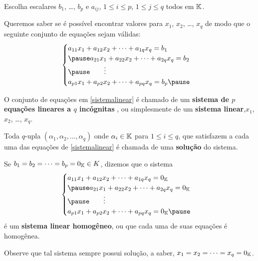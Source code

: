 \documentclass{beamer}
\begin{document}
        \begin{frame}
 
        \vspace{.3cm}

        Escolha escalares $b_1$, \dots, $b_p$ \pause e $a_{ij}$, \pause $1 \le i \le p$, $1 \le j \le q$ todos em $\mathbb{K}$.

        Queremos saber se é possível encontrar valores para  $x_1$, $x_2$, \dots, $x_q$ \pause de modo que o seguinte conjunto de equações sejam válidas: \pause
        \begin{equation}\label{sistemalinear}\index{Sistema Linear}
	    \begin{cases}
                a_{11}x_1 + a_{12}x_2 + \cdots + a_{1q}x_q = b_1\\\pause
                a_{21}x_1 + a_{22}x_2 + \cdots + a_{2q}x_q = b_2\\\pause
                \qquad \vdots\\
                a_{p1}x_1 + a_{p2}x_2 + \cdots + a_{pq}x_q = b_p\pause
            \end{cases}
        \end{equation}
        
        O conjunto de equações em \eqref{sistemalinear} é chamado de um \pause \textbf{sistema de $p$ equa\c{c}\~oes lineares \pause a $q$ inc\'ognitas} \pause , ou simplesmente de um \textbf{sistema linear},\pause$x_1$, $x_2$, \dots, $x_q$.\pause

        \vspace{.3cm}

        Toda $q$-upla $(\alpha_1, \alpha_2, \dots, \alpha_q)$ \pause onde $\alpha_i \in \mathbb{K}$ para $1 \le i \le q$, \pause que satisfazem a cada uma das equa\c{c}\~oes de \eqref{sistemalinear} \pause \'e chamada de uma \textbf{solu\c{c}\~ao} do sistema.
    \end{frame}

    \begin{frame}
        Se $b_1 = b_2 = \cdots = b_p = 0_{\mathbb{K}} \in K$, \pause dizemos que o sistema\pause
        \begin{equation}\label{sistemalinearhomogeneo}\index{Sistema Linear}
            \begin{cases}
                a_{11}x_1 + a_{12}x_2 + \cdots + a_{1q}x_q = 0_\cp{K}\\\pause
                a_{21}x_1 + a_{22}x_2 + \cdots + a_{2q}x_q = 0_\cp{K}\\\pause
                \qquad \vdots\\
                a_{p1}x_1 + a_{p2}x_2 + \cdots + a_{pq}x_q = 0_\cp{K}\pause
            \end{cases}
        \end{equation}
        \'e um \textbf{sistema linear homog\^eneo}, \pause ou que cada uma de suas equa\c{c}\~oes \'e homog\^enea. \pause

        \vspace{.3cm}

        Observe que tal sistema sempre possui solu\c{c}\~ao, \pause a saber, $x_1 = x_2 = \cdots = x_q = 0_{\mathbb{K}}$.
    \end{frame}
\end{document}
